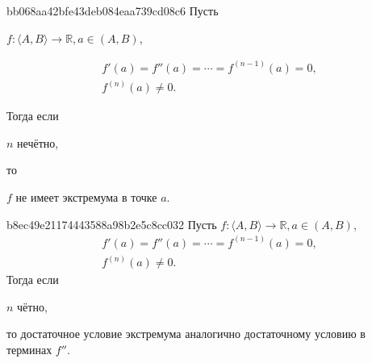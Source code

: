 \begin{note}{bb068aa42bfe43deb084eaa739cd08c6}
    Пусть \begin{icloze}{4}\( f : \langle A, B \rangle \to \mathbb R, a \in (A, B) \),\end{icloze}
    \begin{icloze}{3}\[
                         \begin{gathered}
                             f'(a) = f''(a) = \cdots = f^{(n - 1)}(a) = 0, \\
                             f^{(n)}(a) \neq 0.
                         \end{gathered}
                     \]\end{icloze}
    Тогда если \begin{icloze}{2}\( n \) нечётно,\end{icloze} то \begin{icloze}{1}\( f \) не имеет экстремума в точке \( a \).\end{icloze}
\end{note}

\begin{note}{b8ec49e21174443588a98b2e5c8cc032}
    Пусть \( f : \langle A, B \rangle \to \mathbb R, a \in (A, B) \),
    \[
        \begin{gathered}
            f'(a) = f''(a) = \cdots = f^{(n - 1)}(a) = 0, \\
            f^{(n)}(a) \neq 0.
        \end{gathered}
    \]
    Тогда если \begin{icloze}{2}\( n \) чётно,\end{icloze} \begin{icloze}{1}то достаточное условие экстремума аналогично достаточному условию в терминах \( f'' \).\end{icloze}
\end{note}



